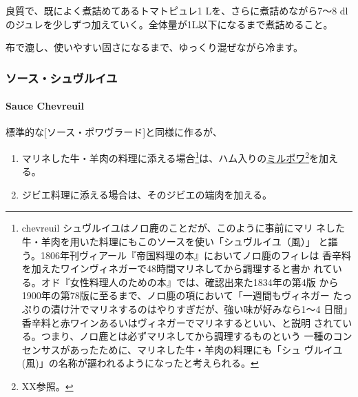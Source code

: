 
良質で、既によく煮詰めてあるトマトピュレ1 Lを、さらに煮詰めながら7〜8
dlのジュレを少しずつ加えていく。全体量が1L以下になるまで煮詰めること。

布で漉し、使いやすい固さになるまで、ゆっくり混ぜながら冷ます。

\maeaki

\hypertarget{ux30bdux30fcux30b9ux30b7ux30e5ux30f4ux30ebux30a4ux30e6}{%
\subsubsection{ソース・シュヴルイユ}\label{ux30bdux30fcux30b9ux30b7ux30e5ux30f4ux30ebux30a4ux30e6}}

\hypertarget{sauce-chevreuil}{%
\paragraph{Sauce Chevreuil}\label{sauce-chevreuil}}


標準的な{[}ソース・ポワヴラード{]}と同様に作るが、

\begin{enumerate}
\def\labelenumi{\arabic{enumi}.}
\item
  マリネした牛・羊肉の料理に添える場合\footnote{chevreuil
    シュヴルイユはノロ鹿のことだが、このように事前にマリ
    ネした牛・羊肉を用いた料理にもこのソースを使い「シュヴルイユ（風）」
    と謳う。1806年刊ヴィアール『帝国料理の本』においてノロ鹿のフィレは
    香辛料を加えたワインヴィネガーで48時間マリネしてから調理すると書か
    れている。オド『女性料理人のための本』では、確認出来た1834年の第4版
    から1900年の第78版に至るまで、ノロ鹿の項において「一週間もヴィネガー
    たっぷりの漬け汁でマリネするのはやりすぎだが、強い味が好みなら1〜4
    日間」香辛料と赤ワインあるいはヴィネガーでマリネするといい、と説明
    されている。つまり、ノロ鹿とは必ずマリネしてから調理するものという
    一種のコンセンサスがあったために、マリネした牛・羊肉の料理にも「シュ
    ヴルイユ(風)」の名称が謳われるようになったと考えられる。}は、ハム入りの\protect\hyperlink{mirepoix}{ミルポワ}\footnote{XX参照。}を加える。
\item
  ジビエ料理に添える場合は、そのジビエの端肉を加える。
\end{enumerate}


